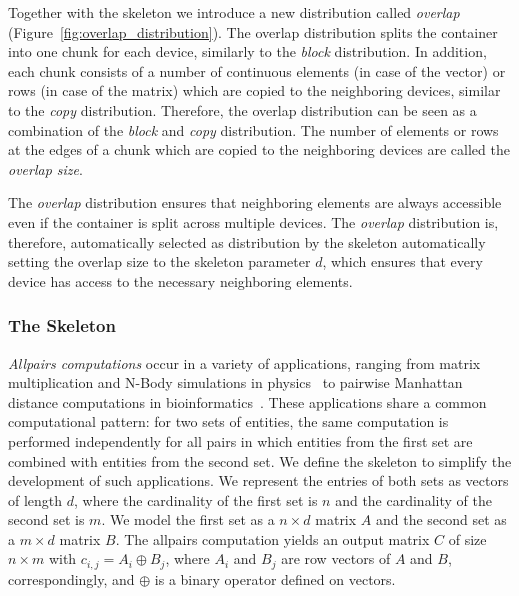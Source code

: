 Together with the \stencil skeleton we introduce a new distribution called \emph{overlap} (Figure~\ref{fig:overlap_distribution}).
The overlap distribution splits the container into one chunk for each device, similarly to the \emph{block} distribution.
In addition, each chunk consists of a number of continuous elements (in case of the vector) or rows (in case of the matrix) which are copied to the neighboring devices, similar to the \emph{copy} distribution.
Therefore, the overlap distribution can be seen as a combination of the \emph{block} and \emph{copy} distribution.
The number of elements or rows at the edges of a chunk which are copied to the neighboring devices are called the \emph{overlap size}.

The \emph{overlap} distribution ensures that neighboring elements are always accessible even if the container is split across multiple devices.
The \emph{overlap} distribution is, therefore, automatically selected as distribution by the \stencil skeleton automatically setting the overlap size to the skeleton parameter $d$, which ensures that every device has access to the necessary neighboring elements.





\subsubsection{The \allpairs Skeleton}
\label{sec:allpairs_skeleton}

\emph{Allpairs computations} occur in a variety of applications, ranging from matrix multiplication and N-Body simulations in physics~\cite{AroraShVu2009} to pairwise Manhattan distance computations in bioinformatics~\cite{ChangDeQuRo2009}.
These applications share a common computational pattern:
for two sets of entities, the same computation is performed independently for all pairs in which entities from the first set are combined with entities from the second set.
We define the \allpairs skeleton to simplify the development of such applications.
We represent the entries of both sets as vectors of length $d$, where the cardinality of the first set is $n$ and the cardinality of the second set is $m$.
We model the first set as a $n\times d$ matrix $A$ and the second set as a $m\times d$ matrix $B$.
The allpairs computation yields an output matrix $C$ of size $n\times m$ with $c_{i, j} = A_i \oplus B_j$, where $A_i$ and $B_j$ are row vectors of $A$ and $B$, correspondingly,
and $\oplus$ is a binary operator defined on vectors.

